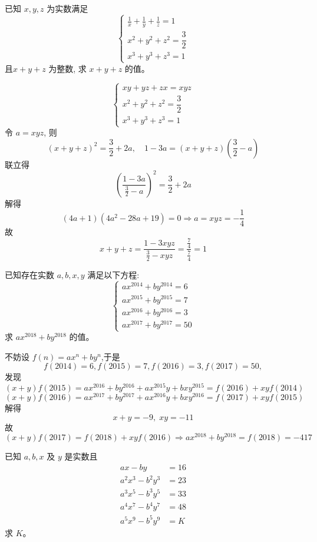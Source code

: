 \begin{questions}
    \question 已知 $x,y,z$ 为实数满足 
    \[
    \begin{cases}
    \displaystyle \frac{1}{x}+\frac{1}{y}+\frac{1}{z}=1 \\[6pt]
    x^2+y^2+z^2=\dfrac{3}{2} \\
    x^3+y^3+z^3=1
    \end{cases}
    \]
    且$x+y+z$ 为整数, 求 $x+y+z$ 的值。
    \begin{solution}
        \[
        \begin{cases}
        xy+yz+zx=xyz \\
        x^2+y^2+z^2=\dfrac{3}{2} \\
        x^3+y^3+z^3=1
        \end{cases}
        \]
        令 $a=xyz$, 则
        \[
        (x+y+z)^2 = \frac{3}{2} + 2a, \quad 1-3a = (x+y+z)\left(\frac{3}{2}-a\right) 
        \]
        联立得
        \[
        \left(\frac{1-3a}{\frac{3}{2}-a}\right)^2 = \frac{3}{2}+2a
        \]
        解得 
        \[
        (4a+1)(4a^2-28a+19)=0 \Rightarrow a=xyz=-\frac{1}{4}
        \]
        故
        \[
        x+y+z = \frac{1-3xyz}{\frac{3}{2}-xyz} = \frac{\frac{7}{4}}{\frac{7}{4}} = 1
        \]
    \end{solution}

    \question 已知存在实数 $a, b, x, y$ 满足以下方程:
    \[
    \begin{cases}
    a x^{2014} + b y^{2014} = 6 \\
    a x^{2015} + b y^{2015} = 7 \\
    a x^{2016} + b y^{2016} = 3 \\
    a x^{2017} + b y^{2017} = 50
    \end{cases}
    \]
    求 $a x^{2018} + b y^{2018}$ 的值。
    \begin{solution} 
        不妨设 $f(n)=ax^n+by^n$,于是
        \[
        f(2014)=6,f(2015)=7,f(2016)=3,f(2017)=50,
        \]
        发现
        \[
        (x+y)f(2015)=ax^{2016}+by^{2016}+ax^{2015}y + bxy^{2015} =f(2016)+xyf(2014)
        \]
        \[
        (x+y)f(2016)=ax^{2017}+by^{2017}+ax^{2016}y + bxy^{2016} =f(2017)+xyf(2015)
        \]
        解得
        \[
        x+y=-9,\;xy=-11
        \]
        故
        \[
        (x+y)f(2017)=f(2018)+xyf(2016) \Rightarrow a x^{2018} + b y^{2018}=f(2018)=-417
        \]
    \end{solution}
\question
已知 $a, b, x$ 及 $y$ 是实数且
\begin{align*}
ax - by &= 16 \\
a^2x^3 - b^2y^3 &= 23 \\
a^3x^5 - b^3y^5 &= 33 \\
a^4x^7 - b^4y^7 &= 48 \\
a^5x^9 - b^5y^9 &= K
\end{align*}
求 $K$。


\end{questions}
